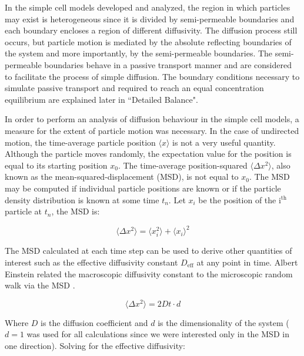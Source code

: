 	In the simple cell models developed and analyzed, the region in which particles may exist is heterogeneous since it is divided by semi-permeable boundaries and each boundary encloses a region of different diffusivity. The diffusion process still occurs, but particle motion is mediated by the absolute reflecting boundaries of the system and more importantly, by the semi-permeable boundaries. The semi-permeable boundaries behave in a passive transport manner and are considered to facilitate the process of simple diffusion. The boundary conditions necessary to simulate passive transport and required to reach an equal concentration equilibrium are explained later in ``Detailed Balance".
	
	In order to perform an analysis of diffusion behaviour in the simple cell models, a measure for the extent of particle motion was necessary. In the case of undirected motion, the time-average particle position $ \langle x \rangle $ is not a very useful quantity. Although the particle moves randomly, the expectation value for the position is equal to its starting position $ x_0 $. The time-average position-squared $ \langle \Delta x^2 \rangle $, also known as the mean-squared-displacement (MSD), is not equal to $ x_0 $. The MSD may be computed if individual particle positions are known or if the particle density distribution is known at some time $ t_n $. Let $ x_i $ be the position of the $ \textrm{i}^\textrm{th} $ particle at $ t_n $, the MSD is:
		
	\begin{equation}
		\langle \Delta x^2 \rangle = \langle x_{i}^2 \rangle + \langle x_i \rangle^2
	\end{equation}
	
	The MSD calculated at each time step can be used to derive other quantities of interest such as the effective diffusivity constant $ D_\textrm{eff} $ at any point in time. Albert Einstein related the macroscopic diffusivity constant to the microscopic random walk via the MSD \citep{diffusion-1}.
	
	\begin{equation}
	\label{eq:einstein-diffusion-steady}
		\langle \Delta x^2 \rangle = 2Dt \cdot d
	\end{equation}
		
	Where $ D $ is the diffusion coefficient and $ d $ is the dimensionality of the system ($ d = 1 $ was used for all calculations since we were interested only in the MSD in one direction). Solving for the effective diffusivity:
	
